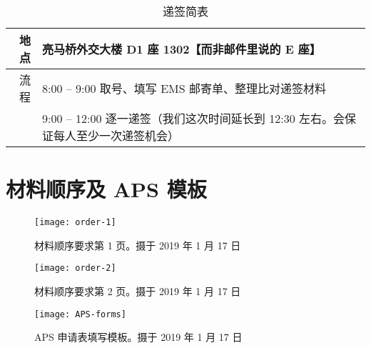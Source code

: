 
\begin{table}[htbp]
  \caption{递签简表}
  \centering
  \begin{tabular}{r|l}
    \toprule
    地点 & 亮马桥外交大楼 {\color{blue} D1 座 1302}【而非邮件里说的 E 座】 \\ \midrule
    流程 & 8:00 -- 9:00 取号、填写 EMS 邮寄单、整理比对递签材料 \\
    & 9:00 -- 12:00 逐一递签（我们这次时间延长到 12:30 左右。会保证每人至少一次递签机会） \\
    \bottomrule
  \end{tabular}
\end{table}




\section{材料顺序及 APS 模板}
\begin{figure}[htbp]
  \centering
  \texttt{[image: order-1]}
  \caption{材料顺序要求第 1 页。摄于 2019 年 1 月 17 日}
  \label{fig:order-1}
\end{figure}
\begin{figure}[htbp]
  \centering
  \texttt{[image: order-2]}
  \caption{材料顺序要求第 2 页。摄于 2019 年 1 月 17 日}
  \label{fig:order-2}
\end{figure}
\begin{figure}[htbp]
  \centering
  \texttt{[image: APS-forms]}
  \caption{APS 申请表填写模板。摄于 2019 年 1 月 17 日}
  \label{fig:APS-forms}
\end{figure}

